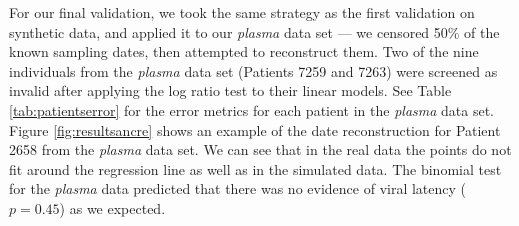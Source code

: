 \documentclass{bmcart}
\begin{document}
For our final validation, we took the same strategy as the first validation on synthetic data, and applied it to our {\em plasma} data set --- we censored 50\% of the known sampling dates, then attempted to reconstruct them.
Two of the nine individuals from the {\em plasma} data set (Patients 7259 and 7263) were screened as invalid after applying the log ratio test to their linear models.
See Table \ref{tab:patientserror} for the error metrics for each patient in the \emph{plasma} data set.
Figure \ref{fig:resultsancre} shows an example of the date reconstruction for Patient 2658 from the \emph{plasma} data set.
We can see that in the real data the points do not fit around the regression line as well as in the simulated data.
The binomial test for the \emph{plasma} data predicted that there was no evidence of viral latency ($p=0.45$) as we expected.
\end{document}
